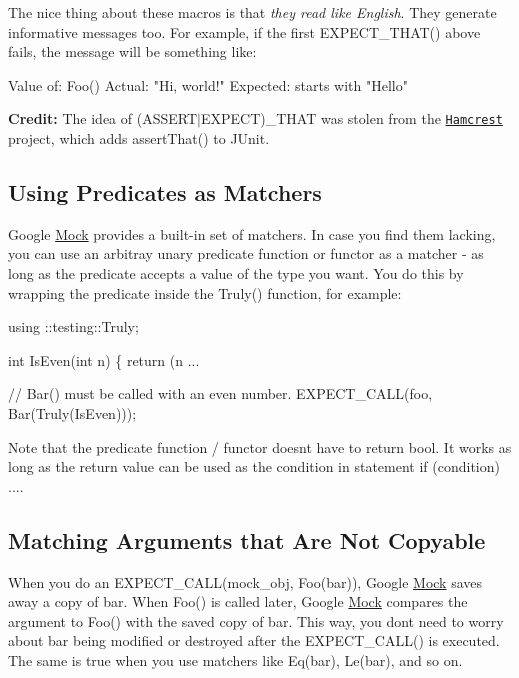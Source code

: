 The nice thing about these macros is that {\itshape they read like English}. They generate informative messages too. For example, if the first {\ttfamily E\+X\+P\+E\+C\+T\+\_\+\+T\+H\+A\+T()} above fails, the message will be something like\+:


\begin{DoxyCode}
Value of: Foo()
  Actual: "Hi, world!"
Expected: starts with "Hello"
\end{DoxyCode}


{\bfseries Credit\+:} The idea of {\ttfamily (A\+S\+S\+E\+R\+T$\vert$\+E\+X\+P\+E\+CT)\+\_\+\+T\+H\+AT} was stolen from the \href{https://github.com/hamcrest/}{\tt Hamcrest} project, which adds {\ttfamily assert\+That()} to J\+Unit.

\subsection*{Using Predicates as Matchers}

Google \hyperlink{classMock}{Mock} provides a built-\/in set of matchers. In case you find them lacking, you can use an arbitray unary predicate function or functor as a matcher -\/ as long as the predicate accepts a value of the type you want. You do this by wrapping the predicate inside the {\ttfamily Truly()} function, for example\+:


\begin{DoxyCode}
using ::testing::Truly;

\textcolor{keywordtype}{int} IsEven(\textcolor{keywordtype}{int} n) \{ \textcolor{keywordflow}{return} (n %
...

  \textcolor{comment}{// Bar() must be called with an even number.}
  EXPECT\_CALL(foo, Bar(Truly(IsEven)));
\end{DoxyCode}


Note that the predicate function / functor doesn\textquotesingle{}t have to return {\ttfamily bool}. It works as long as the return value can be used as the condition in statement {\ttfamily if (condition) ...}.

\subsection*{Matching Arguments that Are Not Copyable}

When you do an {\ttfamily E\+X\+P\+E\+C\+T\+\_\+\+C\+A\+L\+L(mock\+\_\+obj, Foo(bar))}, Google \hyperlink{classMock}{Mock} saves away a copy of {\ttfamily bar}. When {\ttfamily Foo()} is called later, Google \hyperlink{classMock}{Mock} compares the argument to {\ttfamily Foo()} with the saved copy of {\ttfamily bar}. This way, you don\textquotesingle{}t need to worry about {\ttfamily bar} being modified or destroyed after the {\ttfamily E\+X\+P\+E\+C\+T\+\_\+\+C\+A\+L\+L()} is executed. The same is true when you use matchers like {\ttfamily Eq(bar)}, {\ttfamily Le(bar)}, and so on.

